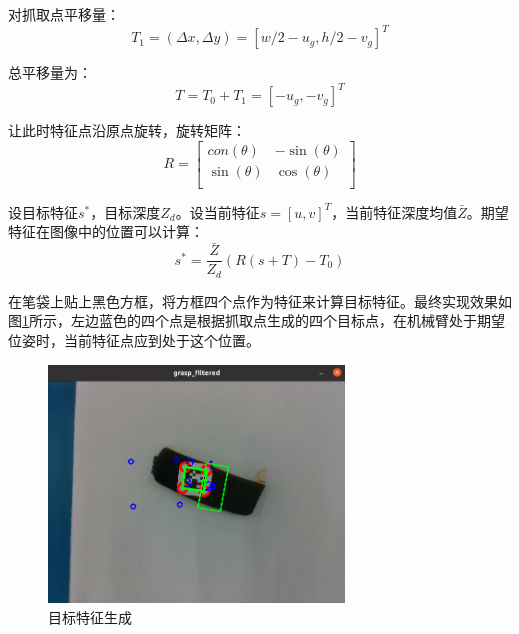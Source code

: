 \documentclass[fontset=fandol,type=bachelor,campus=harbin]{hithesisbook}
\begin{document}
对抓取点平移量：
\begin{equation}
T_1=\left( \varDelta x,\varDelta y \right) =\left[ w/2-u_g,h/2-v_g \right] ^T
\label{目标特征转化抓取点平移量}
\end{equation}


总平移量为：
\begin{equation}
T=T_0+T_1=\left[ -u_g,-v_g \right] ^T
\label{目标特征转化总平移量}
\end{equation}


让此时特征点沿原点旋转，旋转矩阵：
\begin{equation}
R=\left[ \begin{matrix}
	con\left( \theta \right)&		-\sin \left( \theta \right)\\
	\sin \left( \theta \right)&		\cos \left( \theta \right)\\
\end{matrix} \right] 
\label{目标特征转化旋转矩阵}
\end{equation}


设目标特征$s^*$，目标深度$Z_d$。设当前特征$s=\left[ u,v \right] ^T$，当前特征深度均值$\bar{Z}$。期望特征在图像中的位置可以计算：
\begin{equation}
s^*=\frac{\bar{Z}}{Z_d}\left( R\left( s+T \right) -T_0 \right)
\label{目标特征生成}
\end{equation}


在笔袋上贴上黑色方框，将方框四个点作为特征来计算目标特征。最终实现效果如图\ref{目标特征生成图}所示，左边蓝色的四个点是根据抓取点生成的四个目标点，在机械臂处于期望位姿时，当前特征点应到处于这个位置。
\begin{figure}[h]
\centering
\includegraphics[width = 0.7\textwidth]{chapter4/目标特征生成}
\caption{目标特征生成}
\label{目标特征生成图}
\end{figure}
\end{document}
